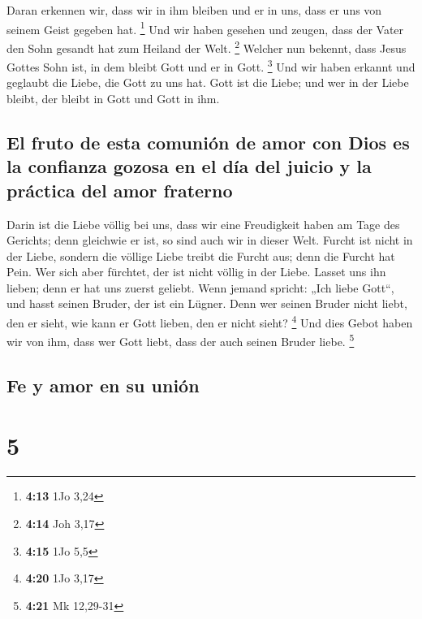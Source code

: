  Daran erkennen wir, dass wir in ihm bleiben und er in
uns, dass er uns von seinem Geist gegeben hat. \footnote{\textbf{4:13}
  1Jo 3,24}  Und wir haben gesehen und zeugen, dass der
Vater den Sohn gesandt hat zum Heiland der Welt. \footnote{\textbf{4:14}
  Joh 3,17}  Welcher nun bekennt, dass Jesus Gottes Sohn
ist, in dem bleibt Gott und er in Gott. \footnote{\textbf{4:15} 1Jo 5,5}
 Und wir haben erkannt und geglaubt die Liebe, die Gott
zu uns hat. Gott ist die Liebe; und wer in der Liebe bleibt, der bleibt
in Gott und Gott in ihm.

\hypertarget{el-fruto-de-esta-comuniuxf3n-de-amor-con-dios-es-la-confianza-gozosa-en-el-duxeda-del-juicio-y-la-pruxe1ctica-del-amor-fraterno}{%
\subsection{El fruto de esta comunión de amor con Dios es la confianza
gozosa en el día del juicio y la práctica del amor
fraterno}\label{el-fruto-de-esta-comuniuxf3n-de-amor-con-dios-es-la-confianza-gozosa-en-el-duxeda-del-juicio-y-la-pruxe1ctica-del-amor-fraterno}}

 Darin ist die Liebe völlig bei uns, dass wir eine
Freudigkeit haben am Tage des Gerichts; denn gleichwie er ist, so sind
auch wir in dieser Welt.  Furcht ist nicht in der Liebe,
sondern die völlige Liebe treibt die Furcht aus; denn die Furcht hat
Pein. Wer sich aber fürchtet, der ist nicht völlig in der Liebe.
 Lasset uns ihn lieben; denn er hat uns zuerst geliebt.
 Wenn jemand spricht: „Ich liebe Gott``, und hasst seinen
Bruder, der ist ein Lügner. Denn wer seinen Bruder nicht liebt, den er
sieht, wie kann er Gott lieben, den er nicht sieht? \footnote{\textbf{4:20}
  1Jo 3,17}  Und dies Gebot haben wir von ihm, dass wer
Gott liebt, dass der auch seinen Bruder liebe. \footnote{\textbf{4:21}
  Mk 12,29-31}

\hypertarget{fe-y-amor-en-su-uniuxf3n}{%
\subsection{Fe y amor en su unión}\label{fe-y-amor-en-su-uniuxf3n}}

\hypertarget{section-4}{%
\section{5}\label{section-4}}

